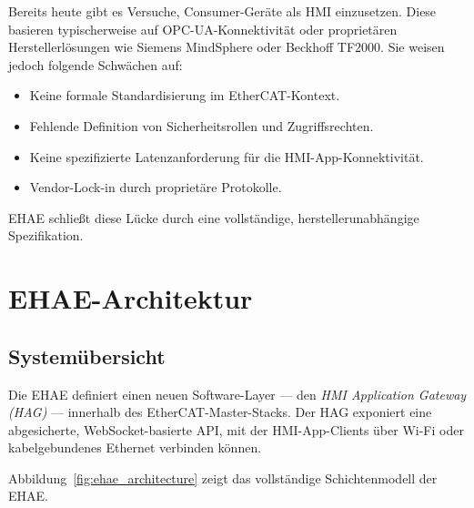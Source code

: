 ﻿\documentclass[12pt,a4paper]{article}
\begin{document}
Bereits heute gibt es Versuche, Consumer-Geräte als HMI einzusetzen. Diese basieren
typischerweise auf OPC-UA-Konnektivität oder proprietären Herstellerlösungen wie
Siemens MindSphere oder Beckhoff TF2000. Sie weisen jedoch folgende Schwächen auf:

\begin{itemize}[leftmargin=2em]
  \item Keine formale Standardisierung im EtherCAT-Kontext.
  \item Fehlende Definition von Sicherheitsrollen und Zugriffsrechten.
  \item Keine spezifizierte Latenzanforderung für die HMI-App-Konnektivität.
  \item Vendor-Lock-in durch proprietäre Protokolle.
\end{itemize}

EHAE schlie\ss{}t diese Lücke durch eine vollständige, herstellerunabhängige Spezifikation.

\section{EHAE-Architektur}
\label{sec:ehae}

\subsection{Systemübersicht}

Die EHAE definiert einen neuen Software-Layer --- den \emph{HMI Application Gateway
(HAG)} --- innerhalb des EtherCAT-Master-Stacks. Der HAG exponiert eine abgesicherte,
WebSocket-basierte API, mit der HMI-App-Clients über Wi-Fi oder kabelgebundenes Ethernet
verbinden können.

Abbildung~\ref{fig:ehae_architecture} zeigt das vollständige Schichtenmodell der EHAE.
\end{document}
